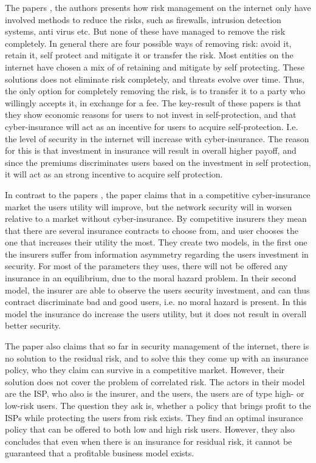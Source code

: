 The papers \cite{bolot2008cyber, bolot2008new}, the authors presents how risk management on the internet only have involved methods to reduce the risks, such as firewalls, intrusion detection systems, anti virus etc. But none of these have managed to remove the risk completely. In general there are four possible ways of removing risk: avoid it, retain it, self protect and mitigate it or transfer the risk. Most entities on the internet have chosen a mix of of retaining and mitigate by self protecting. These solutions does not eliminate risk completely, and threats evolve over time. Thus, the only option for completely removing the risk, is to transfer it to a party who willingly accepts it, in exchange for a fee. 
The key-result of these papers is that they show economic reasons for users to not invest in self-protection, and that cyber-insurance will act as an incentive for users to acquire self-protection. I.e. the level of security in the internet will increase with cyber-insurance. The reason for this is that investment in insurance will result in overall higher payoff, and since the premiums discriminates users based on the investment in self protection, it will act as an strong incentive to acquire self protection. 

In contrast to the papers \cite{bolot2008cyber, bolot2008new}, the paper \cite{shetty2010competitive} claims that in a competitive cyber-insurance market the users utility will improve, but the network security will in worsen relative to a market without cyber-insurance. By competitive insurers they mean that there are several insurance contracts to choose from, and user chooses the one that increases their utility the most.
They create two models, in the first one the insurers suffer from information asymmetry regarding the users investment in security. For most of the parameters they uses, there will not be offered any insurance in an equilibrium, due to the moral hazard problem. In their second model, the insurer are able to observe the users security investment, and can thus contract discriminate bad and good users, i.e. no moral hazard is present. In this model the insurance do increase the users utility, but it does not result in overall better security.  

The paper \cite{radosavac2008using} also claims that so far in security management of the internet, there is no solution to the residual risk, and to solve this they come up with an insurance policy, who they claim can survive in a competitive market. However, their solution does not cover the problem of correlated risk.
The actors in their model are the ISP, who also is the insurer, and the users, the users are of type high- or low-risk users. The question they ask is, whether a policy that brings profit to the ISPs while protecting the users from risk exists. They find an optimal insurance policy that can be offered to both low and high risk users. However, they also concludes that even when there is an insurance for residual risk, it cannot be guaranteed that a profitable business model exists. 

